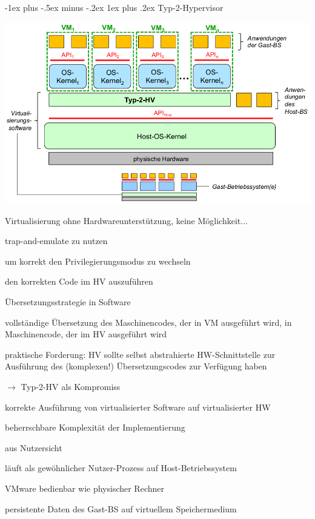 \documentclass[a4paper]{article}
\makeatletter
\renewcommand{\subsubsection}{\@startsection{subsubsection}{3}{0mm}%
 {-1ex plus -.5ex minus -.2ex}%
 {1ex plus .2ex}%
 {\normalfont\small\bfseries}}
\makeatother
\begin{document}
\begin{multicols}{3}
    \subsubsection{Typ-2-Hypervisor}
    \begin{center}
        \includegraphics[width=.6\linewidth]{Assets/AdvancedOperatingSystems-typ-2-hypervisor.png}
    \end{center}

    Virtualisierung ohne Hardwareunterstützung, keine Möglichkeit...
    \begin{itemize*}
        \item trap-and-emulate zu nutzen
        \item um korrekt den Privilegierungsmodus zu wechseln
        \item den korrekten Code im HV auszuführen
    \end{itemize*}

    Übersetzungsstrategie in Software
    \begin{itemize*}
        \item vollständige Übersetzung des Maschinencodes, der in VM ausgeführt wird, in Maschinencode, der im HV ausgeführt wird
        \item praktische Forderung: HV sollte selbst abstrahierte HW-Schnittstelle zur Ausführung des (komplexen!) Übersetzungscodes zur Verfügung haben
        \item[$\rightarrow$] Typ-2-HV als Kompromiss
        \item korrekte Ausführung von virtualisierter Software auf virtualisierter HW
        \item beherrschbare Komplexität der Implementierung
    \end{itemize*}

    aus Nutzersicht
    \begin{itemize*}
        \item läuft als gewöhnlicher Nutzer-Prozess auf Host-Betriebssystem
        \item VMware bedienbar wie physischer Rechner
        \item persistente Daten des Gast-BS auf virtuellem Speichermedium
    \end{itemize*}


\end{multicols}
\end{document}
